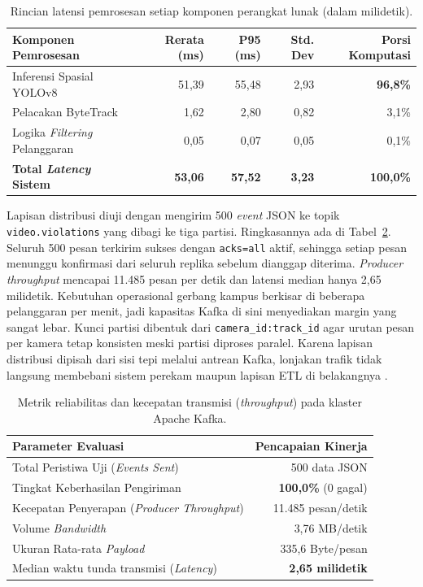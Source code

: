 \begin{table}[htbp]
\centering
\caption{Rincian latensi pemrosesan setiap komponen perangkat lunak (dalam milidetik).}
\label{tab:latency-decomposition}
\small
\setlength{\tabcolsep}{4pt}
\begin{tabularx}{\textwidth}{>{\RaggedRight\arraybackslash}Xrrrr}
\toprule
\textbf{Komponen Pemrosesan} & \textbf{Rerata (ms)} & \textbf{P95 (ms)} & \textbf{Std. Dev} & \textbf{Porsi Komputasi} \\
\midrule
Inferensi Spasial YOLOv8 & 51,39 & 55,48 & 2,93 & \textbf{96,8\%} \\
Pelacakan ByteTrack & 1,62 & 2,80 & 0,82 & 3,1\% \\
Logika \textit{Filtering} Pelanggaran & 0,05 & 0,07 & 0,05 & 0,1\% \\
\midrule
\textbf{Total \textit{Latency} Sistem} & \textbf{53,06} & \textbf{57,52} & \textbf{3,23} & \textbf{100,0\%} \\
\bottomrule
\end{tabularx}
\end{table}

Lapisan distribusi diuji dengan mengirim 500 \textit{event} JSON ke topik \texttt{video.violations} yang dibagi ke tiga partisi. Ringkasannya ada di Tabel~\ref{tab:kafka-throughput}. Seluruh 500 pesan terkirim sukses dengan \texttt{acks=all} aktif, sehingga setiap pesan menunggu konfirmasi dari seluruh replika sebelum dianggap diterima. \textit{Producer throughput} mencapai 11.485 pesan per detik dan latensi median hanya 2,65 milidetik. Kebutuhan operasional gerbang kampus berkisar di beberapa pelanggaran per menit, jadi kapasitas Kafka di sini menyediakan margin yang sangat lebar. Kunci partisi dibentuk dari \texttt{camera\_id:track\_id} agar urutan pesan per kamera tetap konsisten meski partisi diproses paralel. Karena lapisan distribusi dipisah dari sisi tepi melalui antrean Kafka, lonjakan trafik tidak langsung membebani sistem perekam maupun lapisan ETL di belakangnya \cite{kleppmann2017designing,ayae2017video}.

\begin{table}[htbp]
\centering
\caption{Metrik reliabilitas dan kecepatan transmisi (\textit{throughput}) pada klaster Apache Kafka.}
\label{tab:kafka-throughput}
\begin{tabular}{lr}
\toprule
\textbf{Parameter Evaluasi} & \textbf{Pencapaian Kinerja} \\
\midrule
Total Peristiwa Uji (\textit{Events Sent}) & 500 data JSON \\
Tingkat Keberhasilan Pengiriman & \textbf{100,0\%} (0 gagal) \\
Kecepatan Penyerapan (\textit{Producer Throughput}) & 11.485 pesan/detik \\
Volume \textit{Bandwidth} & 3,76 MB/detik \\
Ukuran Rata-rata \textit{Payload} & 335,6 Byte/pesan \\
Median waktu tunda transmisi (\textit{Latency}) & \textbf{2,65 milidetik} \\
\bottomrule
\end{tabular}
\end{table}


